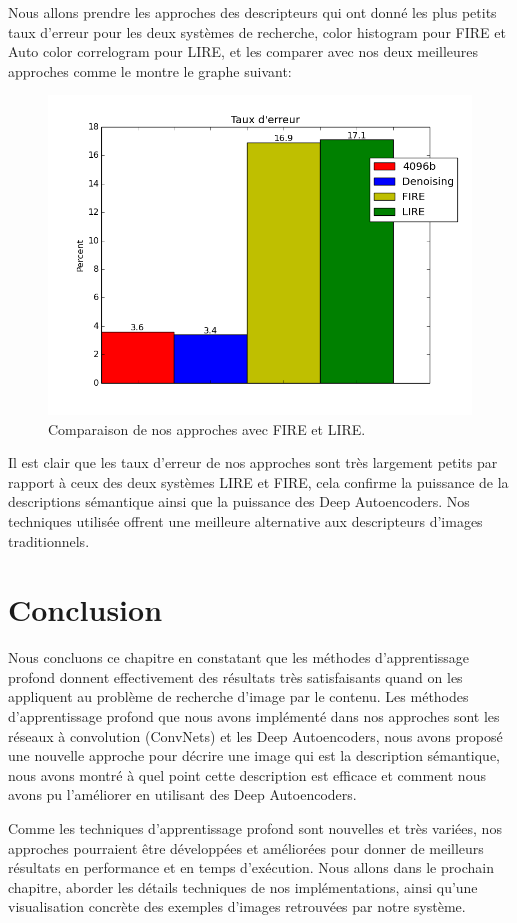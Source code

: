 	Nous allons prendre les approches des descripteurs qui ont donné les plus petits taux d'erreur pour les deux systèmes de recherche, color histogram pour FIRE et Auto color correlogram pour LIRE, et les comparer avec nos deux meilleures approches comme le montre le graphe suivant:
	
\begin{figure}[H]
\centering
\includegraphics[width=5in]{Figures/results/res-wang4.png}
\caption[An Electron]{Comparaison de nos approches avec FIRE et LIRE.}
\label{fig:Electron}
\end{figure}
	
	Il est clair que les taux d'erreur de nos approches sont très largement petits par rapport à ceux des deux systèmes LIRE et FIRE, cela confirme la puissance de la descriptions sémantique ainsi que la puissance des Deep Autoencoders. Nos techniques utilisée offrent une meilleure alternative aux descripteurs d'images traditionnels.
	
\section{Conclusion}

	Nous concluons ce chapitre en constatant que les méthodes d'apprentissage profond donnent effectivement des résultats très satisfaisants quand on les appliquent au problème de recherche d'image par le contenu.
	Les méthodes d'apprentissage profond que nous avons implémenté dans nos approches sont les réseaux à convolution (ConvNets) et les Deep Autoencoders, nous avons proposé une nouvelle approche pour décrire une image qui est la description sémantique, nous avons montré à quel point cette description est efficace et comment nous avons pu l'améliorer en utilisant des Deep Autoencoders.
	
	Comme les techniques d'apprentissage profond sont nouvelles et très variées, nos approches pourraient être développées et améliorées pour donner de meilleurs résultats en performance et en temps d’exécution. Nous allons dans le prochain chapitre, aborder les détails techniques de nos implémentations, ainsi qu'une visualisation concrète des exemples d'images retrouvées par notre système.
